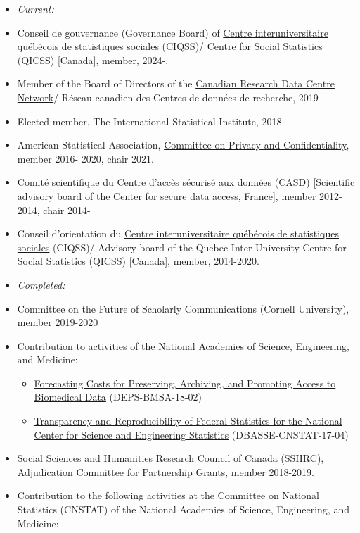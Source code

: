 \documentclass[10pt,letterpaper]{report}
\begin{document}
\begin{itemize}
\item[] \textit{Current:}

\item Conseil de gouvernance (Governance Board) of \href{https://ciqss.org}{Centre interuniversitaire 	qu\'eb\'ecois de statistiques sociales} (CIQSS)/ 
Centre for Social Statistics (QICSS) [Canada], member, 2024-.
\item Member of the Board of Directors of the \href{https://crdcn.org/}{Canadian Research Data Centre Network}/ R\'eseau canadien des Centres de donn\'ees de recherche, 2019- 
\item Elected member, The International Statistical Institute, 2018-
\item American Statistical Association, \href{http://community.amstat.org/cpc/home}{Committee on Privacy and Confidentiality}, member 2016- 2020, chair 2021.
\item Comit\'e scientifique du \href{https://casd.eu/}{Centre d'acc\`es s\'ecuris\'e aux 
donn\'ees} (CASD) [Scientific advisory board of the Center for secure data 
access, France], member 2012-2014, chair 2014-  
\item Conseil d'orientation du \href{https://ciqss.org}{Centre interuniversitaire 	qu\'eb\'ecois de statistiques sociales} (CIQSS)/ Advisory board of the Quebec Inter-University 
Centre for Social Statistics (QICSS) [Canada], member, 2014-2020.
\item[] \textit{Completed:}
\item Committee on the Future of Scholarly Communications (Cornell University), member 2019-2020 
\item Contribution to activities of the National Academies of Science, Engineering, and Medicine:
\begin{itemize}
	\item \href{https://www8.nationalacademies.org/pa/projectview.aspx?key=51436}{Forecasting Costs for Preserving, Archiving, and Promoting Access to Biomedical Data} (DEPS-BMSA-18-02)
	\item \href{https://www8.nationalacademies.org/pa/projectview.aspx?key=51187}{Transparency and Reproducibility of Federal Statistics for the National Center for Science and Engineering Statistics} (DBASSE-CNSTAT-17-04)
\end{itemize} 
\item Social Sciences and Humanities Research Council of Canada (SSHRC), Adjudication Committee for Partnership Grants, member 2018-2019.
\item Contribution to the following activities at the Committee on National Statistics (CNSTAT) of the National Academies of Science, Engineering, and Medicine:

\end{itemize}
\end{document}
